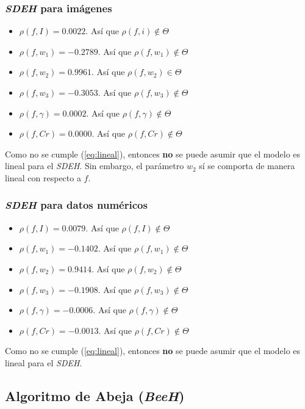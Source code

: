 \subsubsection{\emph{SDEH} para imágenes}
\begin{itemize}
    \item $\rho(f, I) = 0.0022$. Así que $\rho(f, i) \notin \Theta$
    \item $\rho(f, w_1) = -0.2789$. Así que $\rho(f, w_1) \notin \Theta$
    \item $\rho(f, w_2) = 0.9961$. Así que $\rho(f, w_2) \in \Theta$
    \item $\rho(f, w_3) = -0.3053$. Así que $\rho(f, w_3) \notin \Theta$
    \item $\rho(f, \gamma) = 0.0002$. Así que $\rho(f, \gamma) \notin \Theta$
    \item $\rho(f, Cr) = 0.0000$. Así que $\rho(f, Cr) \notin \Theta$
\end{itemize}

    Como no se cumple (\ref{eq:lineal}), entonces \textbf{no} se puede asumir
que el modelo es lineal para el \emph{SDEH}. Sin embargo, el parámetro $w_2$ sí
se comporta de manera lineal con respecto a $f$.

\subsubsection{\emph{SDEH} para datos numéricos}
\begin{itemize}
    \item $\rho(f, I) = 0.0079$. Así que $\rho(f, I) \notin \Theta$
    \item $\rho(f, w_1) = -0.1402$. Así que $\rho(f, w_1) \notin \Theta$
    \item $\rho(f, w_2) = 0.9414$. Así que $\rho(f, w_2) \notin \Theta$
    \item $\rho(f, w_3) = -0.1908$. Así que $\rho(f, w_3) \notin \Theta$
    \item $\rho(f, \gamma) = -0.0006$. Así que $\rho(f, \gamma) \notin \Theta$
    \item $\rho(f, Cr) = -0.0013$. Así que $\rho(f, Cr) \notin \Theta$
\end{itemize}

    Como no se cumple (\ref{eq:lineal}), entonces \textbf{no} se puede asumir
que el modelo es lineal para el \emph{SDEH}.

\subsection{Algoritmo de Abeja (\emph{BeeH})}

